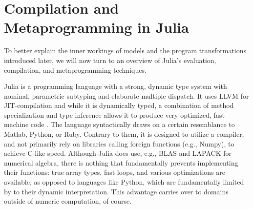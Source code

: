 \section{Compilation and Metaprogramming in Julia}
\label{sec:comp-metapr-julia}

To better explain the inner workings of \turingjl{} models and the program transformations
introduced later, we will now turn to an overview of Julia's evaluation, compilation, and
metaprogramming techniques.

Julia \parencite{bezanson2017julia} is a programming language with a strong, dynamic type system
with nominal, parametric subtyping and elaborate multiple dispatch.  It uses LLVM
\parencite{llvmproject2019llvm} for JIT-compilation and while it is dynamically typed, a combination
of method specialization and type inference allows it to produce very optimized, fast machine code
\parencite{bezanson2018julia}.  The language syntactically draws on a certain resemblance to Matlab,
Python, or Ruby.  Contrary to them, it is designed to utilize a compiler, and not primarily rely on
libraries calling foreign functions (e.g., Numpy), to achieve C-like speed.  Although Julia does
use, e.g., BLAS and LAPACK for numerical algebra, there is nothing that fundamentally prevents
implementing their functions: true array types, fast loops, and various optimizations are available,
as opposed to languages like Python, which are fundamentally limited by to their dynamic
interpretation.  This advantage carries over to domains outside of numeric computation, of course.

